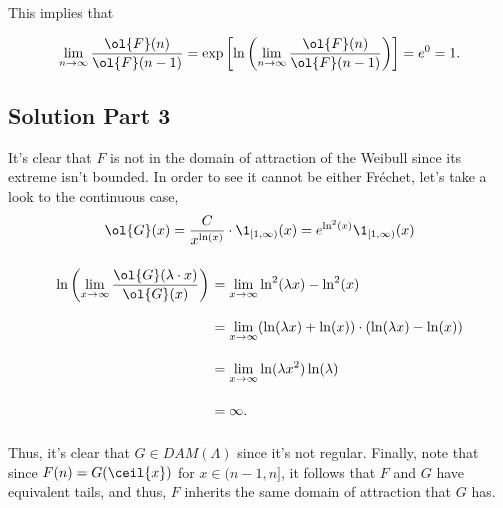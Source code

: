 This implies that

\[ \lim_{n\to\infty} \frac{\ol{F}(n)}{\ol{F}(n-1)} = \exp\left[ \ln \left( \lim_{n\to\infty} \frac{\ol{F}(n)}{\ol{F}(n-1)}  \right) \right] = e^0 = 1.   \]


\subsection*{Solution Part 3}

It's clear that $F$ is not in the domain of attraction of the Weibull since its extreme isn't bounded. In order to see it cannot be either Fréchet, let's take a look to the continuous case,
\[ \ol{G}(x) = \frac{C}{{x}^{\ln(x)}} \cdot \1_{[1,\infty)}(x) = e^{\ln^2(x)} \1_{[1,\infty)}(x) \]

\[ \everymath{\displaystyle}
\arraycolsep=1.8pt\def\arraystretch{2.5}
\begin{array}{rl}
    \ln\left( \lim_{x\to\infty} \frac{\ol{G}(\lambda \cdot x)}{\ol{G}(x)} \right)
    & = \lim_{x\to\infty} \ln^2(\lambda x) - \ln^2(x)\\
    & = \lim_{x\to\infty} (\ln(\lambda x) + \ln(x)) \cdot (\ln(\lambda x) - \ln(x))\\
    & = \lim_{x\to\infty} \ln(\lambda x^2) \ln(\lambda)\\
    & = \infty.
\end{array} \]

Thus, it's clear that $G \in DAM(\Lambda)$ since it's not regular. Finally, note that since $F(n) = G(\ceil{x})$ for $x \in (n-1,n]$, it follows that $F$ and $G$ have equivalent tails, and thus, $F$ inherits the same domain of attraction that $G$ has.






